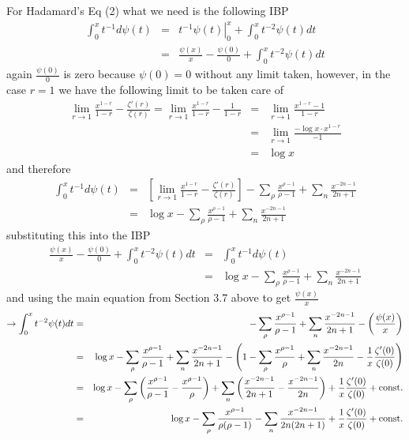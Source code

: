 \documentclass[aps,preprint,preprintnumbers,nofootinbib,showpacs,prd]{revtex4-1}
\newcommand{\nbea}{\begin{eqnarray*}}
\newcommand{\neea}{\end{eqnarray*}}
\begin{document}
For Hadamard's Eq (2) what we need is the following IBP
%
\nbea
\int_0^x t^{-1} d\psi(t) & = & \left. t^{-1} \psi(t) \right|_0^x + \int_0^x t^{-2} \psi(t) dt \\
& = & \frac{\psi(x)}{x} - \frac{\psi(0)}{0} + \int_0^x t^{-2} \psi(t) dt
\neea
%
again $\frac{\psi(0)}{0}$ is zero because $\psi(0) = 0$ without any limit taken, however, in the case $r=1$ we have the following limit to be taken care of
%
\nbea
\lim_{r\to 1}\frac{x^{1-r}}{1-r} - \frac{\zeta'(r)}{\zeta(r)} = \lim_{r\to 1}\frac{x^{1-r}}{1-r} - \frac{1}{1 - r} & = & \lim_{r\to1} \frac{x^{1-r} - 1}{1 - r} \\
& = & \lim_{r\to1} \frac{-\log x \cdot x^{1-r}}{-1} \\
& = & \log x
\neea
%
and therefore
%
\nbea
\int_0^x t^{-1} d\psi(t) & = & \left \lbrack \lim_{r\to 1}\frac{x^{1-r}}{1-r} - \frac{\zeta'(r)}{\zeta(r)}\right \rbrack - \sum_\rho \frac{x^{\rho-1}}{\rho-1} + \sum_n \frac{x^{-2n-1}}{2n+1}  \\
& = & \log x - \sum_\rho \frac{x^{\rho-1}}{\rho-1} + \sum_n \frac{x^{-2n-1}}{2n+1}
\neea
%
substituting this into the IBP
%
\nbea
\frac{\psi(x)}{x} - \frac{\psi(0)}{0} + \int_0^x t^{-2} \psi(t) dt  & = & \int_0^x t^{-1} d\psi(t) \\
& = & \log x - \sum_\rho \frac{x^{\rho-1}}{\rho-1} + \sum_n \frac{x^{-2n-1}}{2n+1}
\neea
%
and using the main equation from Section 3.7 above to get $\frac{\psi(x)}{x}$
%
\nbea
\to \int_0^x t^{-2} \psi(t) dt & = & - \sum_\rho \frac{x^{\rho-1}}{\rho-1} + \sum_n \frac{x^{-2n-1}}{2n+1} - \left(\frac{\psi(x)}{x}\right) \\
& = & \log x - \sum_\rho \frac{x^{\rho-1}}{\rho-1} + \sum_n \frac{x^{-2n-1}}{2n+1}-\left (1 - \sum_\rho \frac{x^{\rho-1}}{\rho} + \sum_n \frac{x^{-2n-1}}{2n} - \frac{1}{x}\frac{\zeta'(0)}{\zeta(0)}\right ) \\
& = & \log x -\sum_\rho \left (\frac{x^{\rho-1}}{\rho-1} - \frac{x^{\rho-1}}{\rho}\right ) + \sum_n \left (\frac{x^{-2n-1}}{2n+1} - \frac{x^{-2n-1}}{2n} \right ) + \frac{1}{x}\frac{\zeta'(0)}{\zeta(0)} + {\rm const.} \\
& = & \log x -\sum_\rho \frac{x^{\rho-1}}{\rho(\rho-1)} - \sum_n \frac{x^{-2n-1}}{2n(2n+1)} + \frac{1}{x}\frac{\zeta'(0)}{\zeta(0)} + {\rm const.}
\neea
%
\end{document}
